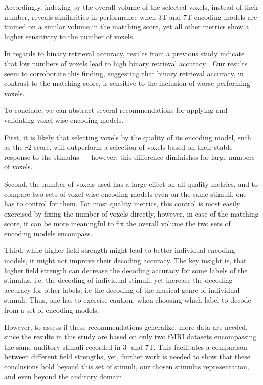 Accordingly, indexing by the overall volume of the selected voxels,
instead of their number, reveals similarities in performance when 3T
and 7T encoding models are trained on a similar volume in the matching
score, yet all other metrics show a higher sensitivity to the number of
voxels.

In regards to binary retrieval accuracy, results from a previous study indicate
that low numbers of voxels lead to high binary retrieval accuracy \citep{hoefle2018identifying}.
Our results seem to corroborate this finding, suggesting that binary retrieval accuracy,
in contrast to the matching score, is sensitive to the inclusion of worse performing voxels.

To conclude, we can abstract several recommendations for applying and validating
voxel-wise encoding models.

First, it is likely that selecting voxels by the quality of its encoding model,
such as the $r2$ score, will outperform a selection of voxels based on their
stable response to the stimulus --- however, this difference diminishes for
large numbers of voxels.

Second, the number of voxels used has a large effect on all quality metrics, and
to compare two sets of voxel-wise encoding models even on the same stimuli, one
has to control for them.
For most quality metrics, this control is most easily exercised by fixing the
number of voxels directly, however, in case of the matching score, it can be
more meaningful to fix the overall volume the two sets of encoding models
encompass.

Third, while higher field strength might lead to better individual encoding
models, it might not improve their decoding accuracy.
The key insight is, that higher field strength can decrease the decoding
accuracy for some labels of the stimulus, i.e. the decoding of individual
stimuli, yet increase the decoding accuracy for other labels, i.e the decoding
of the musical genre of individual stimuli.
Thus, one has to exercise caution, when choosing which label to decode from a set
of encoding models.

However, to assess if these recommendations generalize, more data are
needed, since the results in this study are based on only two f{MRI} datasets
encompassing the same auditory stimuli recorded in 3- and 7T.
This facilitates a comparison between different field
strengths, yet, further work is needed to show that these conclusions hold beyond
this set of stimuli, our chosen stimulus representation, and even beyond the auditory domain.

